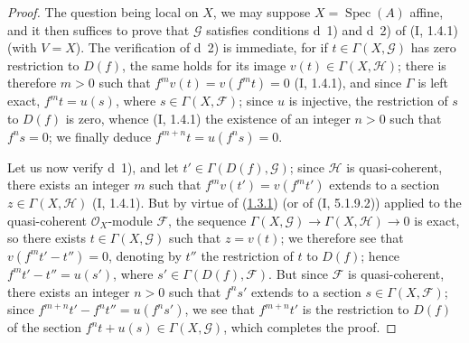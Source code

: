 \begin{proof}
The question being local on $X$, we may suppose
$X=\operatorname{Spec}(A)$ affine, and it then suffices to prove that
$\mathcal G$ satisfies conditions d~1) and d~2) of (I, 1.4.1) (with
$V=X$). The verification of d~2) is immediate, for if
$t\in\Gamma(X,\mathcal G)$ has zero restriction to $D(f)$, the same holds
for its image $v(t)\in\Gamma(X,\mathcal H)$; there is therefore $m>0$ such
that $f^mv(t)=v(f^mt)=0$ (I, 1.4.1), and since $\Gamma$ is left exact,
$f^mt=u(s)$, where $s\in\Gamma(X,\mathcal F)$; since $u$ is injective, the
restriction of $s$ to $D(f)$ is zero, whence (I, 1.4.1) the existence of an
integer $n>0$ such that $f^ns=0$; we finally deduce
$f^{m+n}t=u(f^ns)=0$.

Let us now verify d~1), and let $t'\in\Gamma(D(f),\mathcal G)$; since
$\mathcal H$ is quasi-coherent, there exists an integer $m$ such that
$f^mv(t')=v(f^mt')$ extends to a section
$z\in\Gamma(X,\mathcal H)$ (I, 1.4.1). But by virtue of
(\hyperref[III.1.3.1]{1.3.1}) (or of (I, 5.1.9.2)) applied to the
quasi-coherent $\mathcal O_X$-module $\mathcal F$, the sequence
$\Gamma(X,\mathcal G)\to\Gamma(X,\mathcal H)\to0$ is exact, so there exists
$t\in\Gamma(X,\mathcal G)$ such that $z=v(t)$; we therefore see that
$v(f^mt'-t'')=0$, denoting by $t''$ the restriction of $t$ to $D(f)$;
hence $f^mt'-t''=u(s')$, where $s'\in\Gamma(D(f),\mathcal F)$. But since
$\mathcal F$ is quasi-coherent, there exists an integer $n>0$ such that $f^ns'$
extends to a section $s\in\Gamma(X,\mathcal F)$; since
$f^{m+n}t'-f^nt''=u(f^ns')$, we see that $f^{m+n}t'$ is the restriction to
$D(f)$ of the section $f^nt+u(s)\in\Gamma(X,\mathcal G)$, which completes
the proof.
\end{proof}

